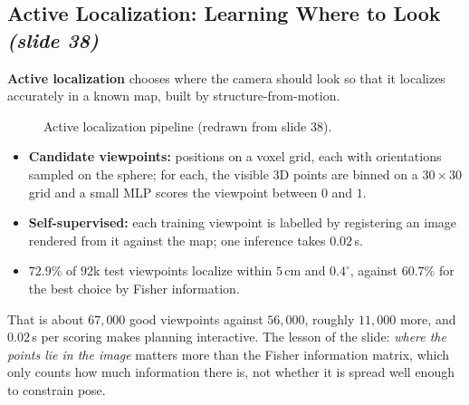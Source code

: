 \documentclass[11pt,a4paper]{article}
\newcommand{\slrs}[1]{\texorpdfstring{\emph{(slide #1)}}{(slide #1)}}
\theoremstyle{definition}
\theoremstyle{plain}
\theoremstyle{remark}
\begin{document}
\subsection{Active Localization: Learning Where to Look \slrs{38}}
\textbf{Active localization} chooses where the camera should look so that it localizes accurately in a known map, built by structure-from-motion.
\begin{figure}[htbp]\centering
{}
\caption{Active localization pipeline (redrawn from slide 38).}
\end{figure}
\begin{itemize}[nosep]
\item \textbf{Candidate viewpoints:} positions on a voxel grid, each with orientations sampled on the sphere; for each, the visible 3D points are binned on a $30\times30$ grid and a small MLP scores the viewpoint between $0$ and $1$.
\item \textbf{Self-supervised:} each training viewpoint is labelled by registering an image rendered from it against the map; one inference takes $0.02$\,s.
\item $72.9\%$ of $92$k test viewpoints localize within $5$\,cm and $0.4^\circ$, against $60.7\%$ for the best choice by Fisher information.
\end{itemize}
\begin{intuition}
That is about $67{,}000$ good viewpoints against $56{,}000$, roughly $11{,}000$ more, and $0.02$\,s per scoring makes planning interactive. The lesson of the slide: \emph{where the points lie in the image} matters more than the Fisher information matrix, which only counts how much information there is, not whether it is spread well enough to constrain pose.
\end{intuition}
\end{document}
